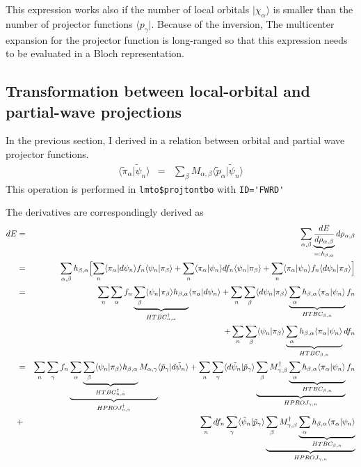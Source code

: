 \documentclass[11pt,a4paper]{report}
\begin{document}
This expression works also if the number of local orbitals
$|\chi_\alpha\rangle$ is smaller than the number of projector
functions $\langle{p}_\gamma|$. Because of the inversion, The
multicenter expansion for the projector function is long-ranged so
that this expression needs to be evaluated in a Bloch representation.

\subsection{Transformation between local-orbital and partial-wave projections}
In the previous section, I derived in  a relation
between orbital and partial wave projector functions.
\begin{eqnarray}
\langle\tilde{\pi}_\alpha|\tilde{\psi}_n\rangle
&=&\sum_\beta M_{\alpha,\beta}\langle\tilde{p}_\alpha|\tilde{\psi}_n\rangle
\end{eqnarray}
This operation is performed in \verb|lmto$projtontbo| with \verb|ID='FWRD'|

The derivatives are correspondingly derived as 
\begin{eqnarray}
dE&=&\sum_{\alpha,\beta}\underbrace{\frac{dE}{d\rho_{\alpha,\beta}}}
_{=:h_{\beta,\alpha}}d\rho_{\alpha,\beta}
\nonumber\\
&=&\sum_{\alpha,\beta}h_{\beta,\alpha}
\Bigl[
\sum_n\langle\pi_\alpha|d\psi_n\rangle f_n\langle\psi_n|\pi_\beta\rangle
+\sum_n\langle\pi_\alpha|\psi_n\rangle df_n\langle\psi_n|\pi_\beta\rangle
+\sum_n\langle\pi_\alpha|\psi_n\rangle f_n\langle{d}\psi_n|\pi_\beta\rangle
\Bigr]
\nonumber\\
&=&\sum_n\sum_{\alpha}
f_n
\underbrace{\sum_{\beta}
\langle\psi_n|\pi_\beta\rangle h_{\beta,\alpha}}_{HTBC^\dagger_{n,\alpha}}
\langle\pi_\alpha|d\psi_n\rangle 
+
\sum_n\sum_{\beta}
\langle{d}\psi_n|\pi_\beta\rangle 
\underbrace{\sum_{\alpha}h_{\beta,\alpha} \langle\pi_\alpha|\psi_n\rangle}_{HTBC_{\beta,n}} f_n
\nonumber\\
&&+
\sum_n\sum_{\beta}
\langle\psi_n|\pi_\beta\rangle 
\underbrace{\sum_{\alpha}h_{\beta,\alpha} \langle\pi_\alpha|\psi_n\rangle}_{HTBC_{\beta,n}} df_n
\nonumber\\
&=&\sum_n\sum_{\gamma}
f_n
\underbrace{\sum_{\alpha}
\underbrace{\sum_{\beta}
\langle\psi_n|\pi_\beta\rangle h_{\beta,\alpha}}_{HTBC^\dagger_{n,\alpha}}
M_{\alpha,\gamma}}_{HPROJ^\dagger_{n,\gamma}}
\langle\tilde{p}_\gamma|d\tilde{\psi}_n\rangle 
+
\sum_n\sum_{\gamma}
\langle{d}\tilde{\psi}_n|\tilde{p}_\gamma\rangle 
\underbrace{
\sum_{\beta}M^\dagger_{\gamma,\beta}
\underbrace{\sum_{\alpha}h_{\beta,\alpha} \langle\pi_\alpha|\psi_n\rangle}_{HTBC_{\beta,n}}}_{HPROJ_{\gamma,n}} f_n
\nonumber\\
&+&
\sum_ndf_n\sum_{\gamma}
\langle\tilde{\psi}_n|\tilde{p}_\gamma\rangle 
\underbrace{
\sum_{\beta}M^\dagger_{\gamma,\beta}
\underbrace{\sum_{\alpha}h_{\beta,\alpha} \langle\pi_\alpha|\psi_n\rangle}_{HTBC_{\beta,n}}}_{HPROJ_{\gamma,n}} 
\end{eqnarray}
\end{document}
